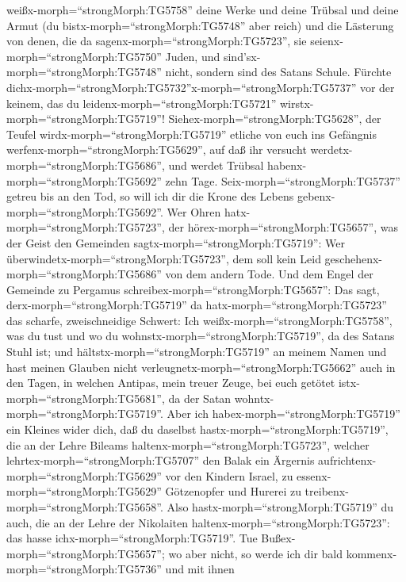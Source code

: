 weißx-morph=``strongMorph:TG5758'' deine Werke und deine Trübsal und
deine Armut (du bistx-morph=``strongMorph:TG5748'' aber reich) und die
Lästerung von denen, die da sagenx-morph=``strongMorph:TG5723'', sie
seienx-morph=``strongMorph:TG5750'' Juden, und
sind'sx-morph=``strongMorph:TG5748'' nicht, sondern sind des Satans
Schule.  Fürchte
dichx-morph=``strongMorph:TG5732''\textbar x-morph=``strongMorph:TG5737''
vor der keinem, das du leidenx-morph=``strongMorph:TG5721''
wirstx-morph=``strongMorph:TG5719''!
Siehex-morph=``strongMorph:TG5628'', der Teufel
wirdx-morph=``strongMorph:TG5719'' etliche von euch ins Gefängnis
werfenx-morph=``strongMorph:TG5629'', auf daß ihr versucht
werdetx-morph=``strongMorph:TG5686'', und werdet Trübsal
habenx-morph=``strongMorph:TG5692'' zehn Tage.
Seix-morph=``strongMorph:TG5737'' getreu bis an den Tod, so will ich dir
die Krone des Lebens gebenx-morph=``strongMorph:TG5692''. 
Wer Ohren hatx-morph=``strongMorph:TG5723'', der
hörex-morph=``strongMorph:TG5657'', was der Geist den Gemeinden
sagtx-morph=``strongMorph:TG5719'': Wer
überwindetx-morph=``strongMorph:TG5723'', dem soll kein Leid
geschehenx-morph=``strongMorph:TG5686'' von dem andern Tode.
 Und dem Engel der Gemeinde zu Pergamus
schreibex-morph=``strongMorph:TG5657'': Das sagt,
derx-morph=``strongMorph:TG5719'' da hatx-morph=``strongMorph:TG5723''
das scharfe, zweischneidige Schwert:  Ich
weißx-morph=``strongMorph:TG5758'', was du tust und wo du
wohnstx-morph=``strongMorph:TG5719'', da des Satans Stuhl ist; und
hältstx-morph=``strongMorph:TG5719'' an meinem Namen und hast meinen
Glauben nicht verleugnetx-morph=``strongMorph:TG5662'' auch in den
Tagen, in welchen Antipas, mein treuer Zeuge, bei euch getötet
istx-morph=``strongMorph:TG5681'', da der Satan
wohntx-morph=``strongMorph:TG5719''.  Aber ich
habex-morph=``strongMorph:TG5719'' ein Kleines wider dich, daß du
daselbst hastx-morph=``strongMorph:TG5719'', die an der Lehre Bileams
haltenx-morph=``strongMorph:TG5723'', welcher
lehrtex-morph=``strongMorph:TG5707'' den Balak ein Ärgernis
aufrichtenx-morph=``strongMorph:TG5629'' vor den Kindern Israel, zu
essenx-morph=``strongMorph:TG5629'' Götzenopfer und Hurerei zu
treibenx-morph=``strongMorph:TG5658''.  Also
hastx-morph=``strongMorph:TG5719'' du auch, die an der Lehre der
Nikolaiten haltenx-morph=``strongMorph:TG5723'': das hasse
ichx-morph=``strongMorph:TG5719''.  Tue
Bußex-morph=``strongMorph:TG5657''; wo aber nicht, so werde ich dir bald
kommenx-morph=``strongMorph:TG5736'' und mit ihnen
